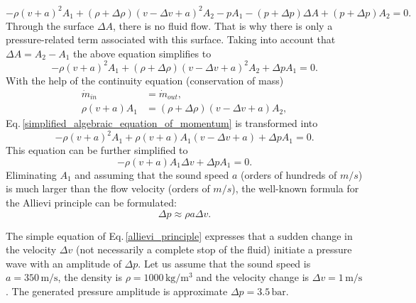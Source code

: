 %
\begin{equation}
- \rho (v+a)^2 A_1 + (\rho+\Delta \rho) (v-\Delta v+a)^2 A_2 - p A_1 - (p+\Delta p) \Delta A + (p+\Delta p) A_2 = 0.
\end{equation}
%
Through the surface $\Delta A$, there is no fluid flow. That is why there is only a pressure-related term associated with this surface. Taking into account that $\Delta A = A_2-A_1$ the above equation simplifies to
%
\begin{equation} \label{simplified_algebraic_equation_of_momentum}
- \rho (v+a)^2 A_1 + (\rho+\Delta \rho) (v-\Delta v+a)^2 A_2 + \Delta p A_1 = 0.
\end{equation}
%
With the help of the continuity equation (conservation of mass)
%
\begin{align}
\dot{m}_{in} &= \dot{m}_{out}, \\
\rho (v+a) A_1 &= (\rho+\Delta \rho) (v-\Delta v+a) A_2,
\end{align}
%
Eq.\,\eqref{simplified_algebraic_equation_of_momentum} is transformed into
%
\begin{equation}
- \rho (v+a)^2 A_1 + \rho (v+a) A_1 (v-\Delta v+a) + \Delta p A_1 = 0.
\end{equation}
%
This equation can be further simplified to
%
\begin{equation}
- \rho (v+a) A_1 \Delta v + \Delta p A_1 = 0.
\end{equation}
%
Eliminating $A_1$ and assuming that the sound speed $a$ (orders of hundreds of $m/s$) is much larger than the flow velocity (orders of $m/s$), the well-known formula for the Allievi principle can be formulated:
%
\begin{equation} \label{allievi_principle}
\Delta p \approx \rho a \Delta v.
\end{equation}

The simple equation of Eq.\,\ref{allievi_principle} expresses that a sudden change in the velocity $\Delta v$ (not necessarily a complete stop of the fluid) initiate a pressure wave with an amplitude of $\Delta p$. Let us assume that the sound speed is $a=350\,\mathrm{m/s}$, the density is $\rho=1000\,\mathrm{kg/m^3}$ and the velocity change is $\Delta v=1\,\mathrm{m/s}$. The generated pressure amplitude is approximate $\Delta p=3.5\,\mathrm{bar}$. 

